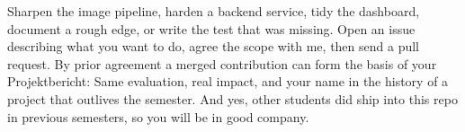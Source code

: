 
Sharpen the image pipeline, harden a backend service, tidy the dashboard, document a rough edge,
or write the test that was missing. Open an issue describing what you want to do,
agree the scope with me, then send a pull request. By prior agreement a merged contribution
can form the basis of your Projektbericht: Same evaluation, real impact, and your name in the
history of a project that outlives the semester. And yes, other students 
did ship into this repo in previous semesters, so you will be in good company.
